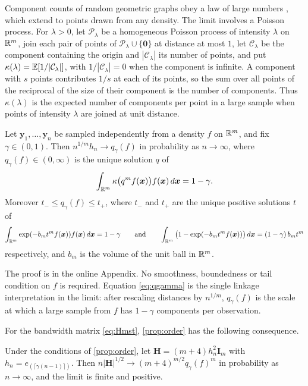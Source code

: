 Component counts of random geometric graphs obey a law of large numbers \citep[Theorem 13.25]{Penrose2003}, which \citet{MitschePenrose2021} extend to points drawn from any density. The limit involves a Poisson process. For $\lambda>0$, let $\mathcal{P}_\lambda$ be a homogeneous Poisson process of intensity $\lambda$ on $\mathbb{R}^m$, join each pair of points of $\mathcal{P}_\lambda\cup\{\bm{0}\}$ at distance at most $1$, let $\mathcal{C}_\lambda$ be the component containing the origin and $|\mathcal{C}_\lambda|$ its number of points, and put $\kappa(\lambda)=\mathbb{E}[1/|\mathcal{C}_\lambda|]$, with $1/|\mathcal{C}_\lambda|=0$ when the component is infinite. A component with $s$ points contributes $1/s$ at each of its points, so the sum over all points of the reciprocal of the size of their component is the number of components. Thus $\kappa(\lambda)$ is the expected number of components per point in a large sample when points of intensity $\lambda$ are joined at unit distance.

\begin{proposition}\label{prop:order}
  Let $\bm{y}_1,\dots,\bm{y}_n$ be sampled independently from a density $f$ on $\mathbb{R}^m$, and fix $\gamma\in(0,1)$. Then $n^{1/m}h_n\to q_\gamma(f)$ in probability as $n\to\infty$, where $q_\gamma(f)\in(0,\infty)$ is the unique solution $q$ of
  \begin{equation}\label{eq:qgamma}
    \int_{\mathbb{R}^m}\kappa\big(q^m f(\bm{x})\big)f(\bm{x})\,d\bm{x}=1-\gamma.
  \end{equation}
  Moreover $t_-\le q_\gamma(f)\le t_+$, where $t_-$ and $t_+$ are the unique positive solutions $t$ of
  $$
  \int_{\mathbb{R}^m}\exp(-b_m t^m f(\bm{x}))f(\bm{x})\,d\bm{x}=1-\gamma
  \qquad\text{and}\qquad
  \int_{\mathbb{R}^m}\big(1-\exp(-b_m t^m f(\bm{x}))\big)\,d\bm{x}=(1-\gamma)\,b_m t^m
  $$
  respectively, and $b_m$ is the volume of the unit ball in $\mathbb{R}^m$.
\end{proposition}

The proof is in the online Appendix. No smoothness, boundedness or tail condition on $f$ is required. Equation \eqref{eq:qgamma} is the single linkage interpretation in the limit: after rescaling distances by $n^{1/m}$, $q_\gamma(f)$ is the scale at which a large sample from $f$ has $1-\gamma$ components per observation.

For the bandwidth matrix \eqref{eq:Hmst}, \cref{prop:order} has the following consequence.

\begin{corollary}\label{cor:critical}
  Under the conditions of \cref{prop:order}, let $\bm{H}=(m+4)h_n^2\bm{I}_m$ with $h_n=e_{(\lceil\gamma(n-1)\rceil)}$. Then $n|\bm{H}|^{1/2}\to(m+4)^{m/2}q_\gamma(f)^m$ in probability as $n\to\infty$, and the limit is finite and positive.
\end{corollary}

